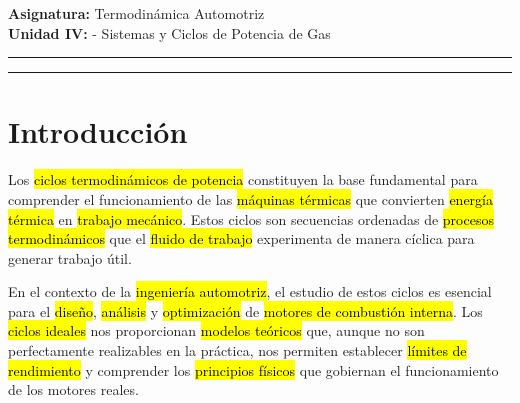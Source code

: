 \documentclass{article}
\begin{document}
	
	\onehalfspacing
	
	
	\textbf{Asignatura:} Termodinámica Automotriz \\
	\textbf{Unidad IV:} - Sistemas y Ciclos de Potencia de Gas
	
	\vspace{5mm}
	\hrule
	\vspace{5mm}

    
    
    \hrule

\vspace{1cm}

    \tableofcontents
    \newpage

    \section{Introducción}

    Los \hl{ciclos termodinámicos de potencia} constituyen la base fundamental para comprender el funcionamiento de las \hl{máquinas térmicas} que convierten \hl{energía térmica} en \hl{trabajo mecánico}. Estos ciclos son secuencias ordenadas de \hl{procesos termodinámicos} que el \hl{fluido de trabajo} experimenta de manera cíclica para generar trabajo útil.

    En el contexto de la \hl{ingeniería automotriz}, el estudio de estos ciclos es esencial para el \hl{diseño}, \hl{análisis} y \hl{optimización} de \hl{motores de combustión interna}. Los \hl{ciclos ideales} nos proporcionan \hl{modelos teóricos} que, aunque no son perfectamente realizables en la práctica, nos permiten establecer \hl{límites de rendimiento} y comprender los \hl{principios físicos} que gobiernan el funcionamiento de los motores reales.
\end{document}
